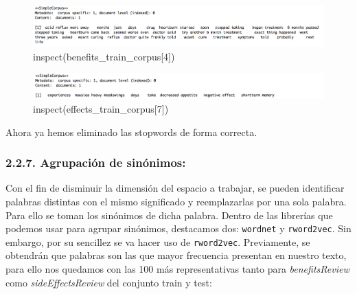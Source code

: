 \documentclass[spanish,]{article}
\begin{document}
\begin{figure}[h]
    \centering
    \includegraphics[width=1\textwidth]{imagenes/benefits_stopwords.png}
    \caption{inspect(benefits\_train\_corpus[4])}
    \label{benefits2}
\end{figure}

\begin{figure}[h]
    \centering
    \includegraphics[width=1\textwidth]{imagenes/effects_stopwords.png}
    \caption{inspect(effects\_train\_corpus[7])}
    \label{benefits2}
\end{figure}

Ahora ya hemos eliminado las stopwords de forma correcta.

\subsubsection{2.2.7. Agrupación de
sinónimos:}\label{agrupacion-de-sinonimos}

Con el fin de disminuir la dimensión del espacio a trabajar, se pueden
identificar palabras distintas con el mismo significado y reemplazarlas
por una sola palabra. Para ello se toman los sinónimos de dicha palabra.
Dentro de las librerías que podemos usar para agrupar sinónimos,
destacamos dos: \texttt{wordnet} y \texttt{rword2vec}. Sin embargo, por
su sencillez se va hacer uso de \texttt{rword2vec}. Previamente, se
obtendrán que palabras son las que mayor frecuencia presentan en nuestro
texto, para ello nos quedamos con las 100 más representativas tanto para
\emph{benefitsReview} como \emph{sideEffectsReview} del conjunto train y
test:
\end{document}
